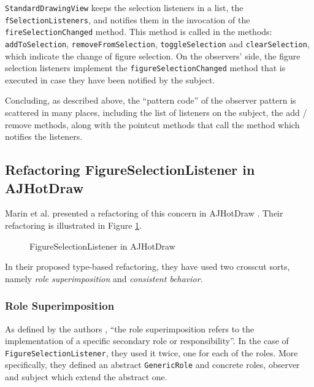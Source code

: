 \texttt{StandardDrawingView} keeps the selection listeners in a list, the \texttt{fSelectionListeners}, and notifies them in the invocation of the \texttt{fireSelectionChanged} method.
This method is called in the methods: \texttt{addToSelection}, \texttt{removeFromSelection}, \texttt{toggleSelection} and \texttt{clearSelection}, which indicate the change of figure selection.
On the observers' side, the figure selection listeners implement the \texttt{figureSelectionChanged} method that is executed in case they have been notified by the subject.

Concluding, as described above, the ``pattern code'' of the observer pattern is scattered in many places, including the list of listeners on the subject, the add / remove methods, along with the pointcut methods that call the method which notifies the listeners.

\subsection{Refactoring FigureSelectionListener in AJHotDraw}
Marin et al. presented a refactoring of this concern in AJHotDraw \cite{marin2005approach}. 
Their refactoring is illustrated in Figure \ref{fig:JHotDraw_FigureSelectionListener_AOP}. 

\begin{figure}[H]
	\centering
  	\caption{FigureSelectionListener in AJHotDraw}
  	\label{fig:JHotDraw_FigureSelectionListener_AOP}
\end{figure}

In their proposed type-based refactoring, they have used two crosscut sorts, namely \textit{role superimposition} and \textit{consistent behavior}.

\subsubsection{Role Superimposition}
As defined by the authors \cite{marin2005classification}, ``the role superimposition refers to the implementation of a specific secondary role or responsibility''.
In the case of \texttt{FigureSelectionListener}, they used it twice, one for each of the roles.
More specifically, they defined an abstract \texttt{GenericRole} and concrete roles, observer and subject which extend the abstract one.

